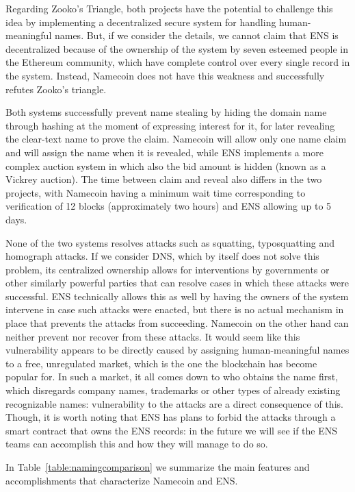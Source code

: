 \documentclass[mscthesis]{usiinfthesis}
\begin{document}
Regarding Zooko's Triangle, both projects have the potential to challenge this idea by implementing a decentralized secure system for handling human-meaningful names. But, if we consider the details, we cannot claim that ENS is decentralized because of the ownership of the system by seven esteemed people in the Ethereum community, which have complete control over every single record in the system. Instead, Namecoin does not have this weakness and successfully refutes Zooko's triangle.

Both systems successfully prevent name stealing by hiding the domain name through hashing at the moment of expressing interest for it, for later revealing the clear-text name to prove the claim. Namecoin will allow only one name claim and will assign the name when it is revealed, while ENS implements a more complex auction system in which also the bid amount is hidden (known as a Vickrey auction). The time between claim and reveal also differs in the two projects, with Namecoin having a minimum wait time corresponding to verification of 12 blocks (approximately two hours) and ENS allowing up to 5 days.

None of the two systems resolves attacks such as squatting, typosquatting and homograph attacks. If we consider DNS, which by itself does not solve this problem, its centralized ownership allows for interventions by governments or other similarly powerful parties that can resolve cases in which these attacks were successful. ENS technically allows this as well by having the owners of the system intervene in case such attacks were enacted, but there is no actual mechanism in place that prevents the attacks from succeeding. Namecoin on the other hand can neither prevent nor recover from these attacks. It would seem like this vulnerability appears to be directly caused by assigning human-meaningful names to a free, unregulated market, which is the one the blockchain has become popular for. In such a market, it all comes down to who obtains the name first, which disregards company names, trademarks or other types of already existing recognizable names: vulnerability to the attacks are a direct consequence of this. Though, it is worth noting that ENS has plans to forbid the attacks through a smart contract that owns the ENS records: in the future we will see if the ENS teams can accomplish this and how they will manage to do so.

In Table~\ref{table:namingcomparison} we summarize the main features and accomplishments that characterize Namecoin and ENS.
\end{document}
